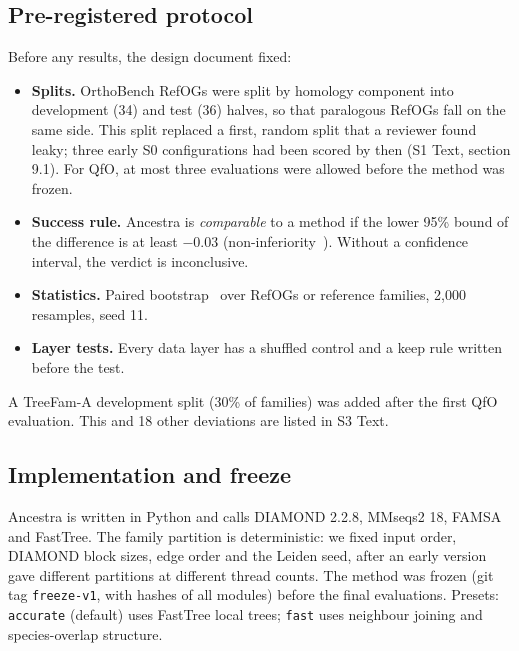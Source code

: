 \subsection*{Pre-registered protocol}
Before any results, the design document fixed:
\begin{itemize}
\item \textbf{Splits.} OrthoBench RefOGs were split by homology component into development (34) and test (36) halves, so that paralogous RefOGs fall on the same side. This split replaced a first, random split that a reviewer found leaky; three early S0 configurations had been scored by then (S1 Text, section 9.1). For QfO, at most three evaluations were allowed before the method was frozen.
\item \textbf{Success rule.} Ancestra is \emph{comparable} to a method if the lower 95\% bound of the difference is at least $-0.03$ (non-inferiority~\cite{piaggio2012consortnoninferiority}). Without a confidence interval, the verdict is inconclusive.
\item \textbf{Statistics.} Paired bootstrap~\cite{efron1979bootstrap} over RefOGs or reference families, 2,000 resamples, seed 11.
\item \textbf{Layer tests.} Every data layer has a shuffled control and a keep rule written before the test.
\end{itemize}
A TreeFam-A development split (30\% of families) was added after the first QfO evaluation. This and 18 other deviations are listed in S3 Text.

\subsection*{Implementation and freeze}
Ancestra is written in Python and calls DIAMOND 2.2.8, MMseqs2 18, FAMSA and FastTree. The family partition is deterministic: we fixed input order, DIAMOND block sizes, edge order and the Leiden seed, after an early version gave different partitions at different thread counts. The method was frozen (git tag \texttt{freeze-v1}, with hashes of all modules) before the final evaluations. Presets: \texttt{accurate} (default) uses FastTree local trees; \texttt{fast} uses neighbour joining and species-overlap structure.

